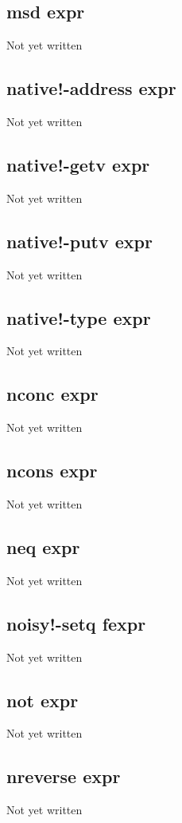 \documentclass[a4paper,11pt]{article}
\begin{document}
\subsection{\ttfamily msd expr}
Not yet written

\subsection{\ttfamily native!-address expr}
Not yet written

\subsection{\ttfamily native!-getv expr}
Not yet written

\subsection{\ttfamily native!-putv expr}
Not yet written

\subsection{\ttfamily native!-type expr}
Not yet written

\subsection{\ttfamily nconc expr}
Not yet written

\subsection{\ttfamily ncons expr}
Not yet written

\subsection{\ttfamily neq expr}
Not yet written

\subsection{\ttfamily noisy!-setq fexpr}
Not yet written

\subsection{\ttfamily not expr}
Not yet written

\subsection{\ttfamily nreverse expr}
Not yet written
\end{document}
